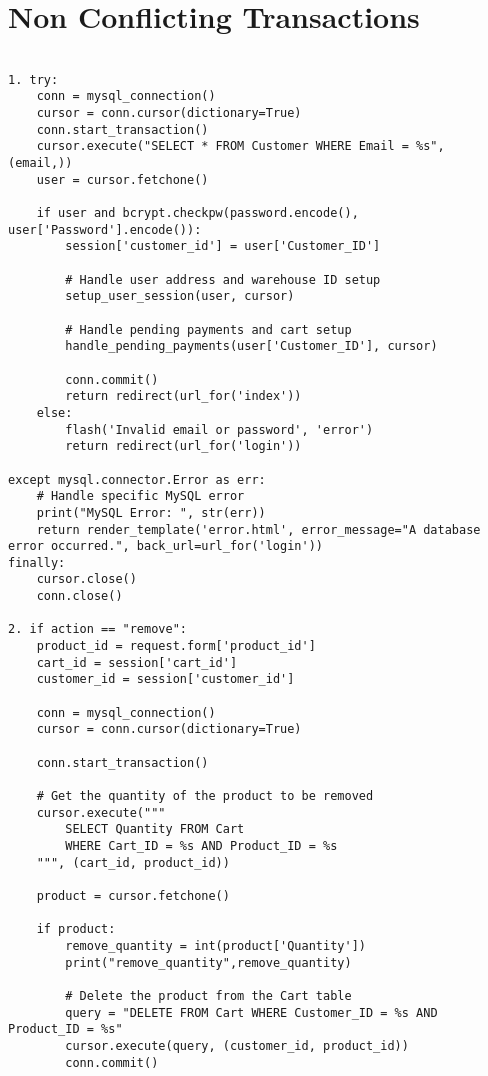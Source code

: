\documentclass[12pt]{article}
\begin{document}
\section*{Non Conflicting Transactions}

\begin{verbatim}

1. try:
    conn = mysql_connection()
    cursor = conn.cursor(dictionary=True)
    conn.start_transaction()
    cursor.execute("SELECT * FROM Customer WHERE Email = %s", (email,))
    user = cursor.fetchone()

    if user and bcrypt.checkpw(password.encode(), user['Password'].encode()):
        session['customer_id'] = user['Customer_ID']
        
        # Handle user address and warehouse ID setup
        setup_user_session(user, cursor)

        # Handle pending payments and cart setup
        handle_pending_payments(user['Customer_ID'], cursor)

        conn.commit()
        return redirect(url_for('index'))
    else:
        flash('Invalid email or password', 'error')
        return redirect(url_for('login'))

except mysql.connector.Error as err:
    # Handle specific MySQL error
    print("MySQL Error: ", str(err))
    return render_template('error.html', error_message="A database error occurred.", back_url=url_for('login'))
finally:
    cursor.close()
    conn.close()

2. if action == "remove":
    product_id = request.form['product_id']
    cart_id = session['cart_id']
    customer_id = session['customer_id']

    conn = mysql_connection()
    cursor = conn.cursor(dictionary=True)
    
    conn.start_transaction()

    # Get the quantity of the product to be removed
    cursor.execute("""
        SELECT Quantity FROM Cart 
        WHERE Cart_ID = %s AND Product_ID = %s
    """, (cart_id, product_id))
    
    product = cursor.fetchone()
    
    if product:
        remove_quantity = int(product['Quantity'])
        print("remove_quantity",remove_quantity)

        # Delete the product from the Cart table
        query = "DELETE FROM Cart WHERE Customer_ID = %s AND Product_ID = %s"
        cursor.execute(query, (customer_id, product_id))
        conn.commit()


\end{verbatim}
\end{document}
